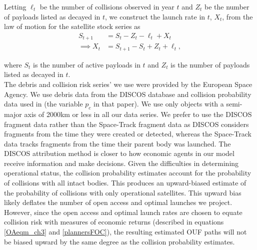 \documentclass[9pt,twoside,lineno]{pnas-new}
\begin{document}

Letting $\ell_t$ be the number of collisions observed in year $t$ and $Z_t$ be the number of payloads listed as decayed in $t$, we construct the launch rate in $t$, $X_t$, from the law of motion for the satellite stock series as
\begin{align}
S_{t+1} &= S_t - Z_t - \ell_t + X_t \nonumber \\
\implies X_t &= S_{t+1} - S_t + Z_t + \ell_t,
\label{launchRateAccounting}
\end{align}

where $S_t$ is the number of active payloads in $t$ and $Z_t$ is the number of payloads listed as decayed in $t$. \\

The debris and collision risk series' we use were provided by the European Space Agency. We use debris data from the DISCOS database \citep{FRAGdata} and collision probability data used in \citep{ECOBdata} (the variable $p_c$ in that paper). We use only objects with a semi-major axis of 2000km or less in all our data series. We prefer to use the DISCOS fragment data rather than the Space-Track fragment data \citep{spacetrackData} as DISCOS considers fragments from the time they were created or detected, whereas the Space-Track data tracks fragments from the time their parent body was launched. The DISCOS attribution method is closer to how economic agents in our model receive information and make decisions. Given the difficulties in determining operational status, the collision probability estimates account for the probability of collisions with all intact bodies. This produces an upward-biased estimate of the probability of collisions with only operational satellites. This upward bias likely deflates the number of open access and optimal launches we project. However, since the open access and optimal launch rates are chosen to equate collision risk with measures of economic returns (described in equations \ref{OAeqm_ch3} and \ref{plannersFOC}), the resulting estimated OUF paths will not be biased upward by the same degree as the collision probability estimates.
\end{document}
